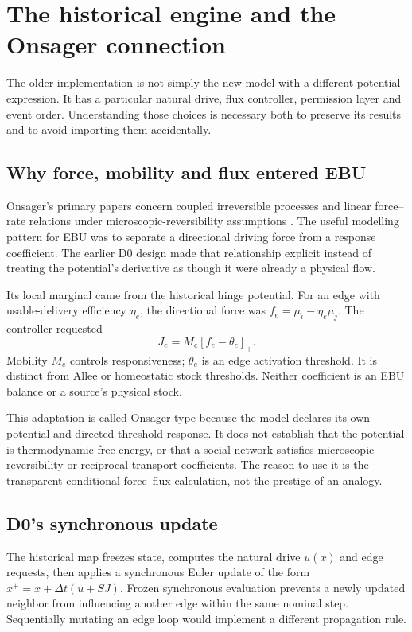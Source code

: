 \chapter{The historical engine and the Onsager connection}\label{ch:legacy-engine}
The older implementation is not simply the new model with a different
potential expression. It has a particular natural drive, flux controller,
permission layer and event order. Understanding those choices is necessary
both to preserve its results and to avoid importing them accidentally.

\section{Why force, mobility and flux entered EBU}
Onsager's primary papers concern coupled irreversible processes and linear
force--rate relations under microscopic-reversibility assumptions
\cite{onsager-one,onsager-two}. The useful modelling pattern for EBU was
to separate a directional driving force from a response coefficient. The
earlier D0 design made that relationship explicit instead of treating the
potential's derivative as though it were already a physical flow.

Its local marginal came from the historical hinge potential. For an edge
with usable-delivery efficiency $\eta_e$, the directional force was
$f_e=\mu_i-\eta_e\mu_j$. The controller requested
\begin{equation}
 J_e=M_e[f_e-\theta_e]_+.
\end{equation}
Mobility $M_e$ controls responsiveness; $\theta_e$ is an edge activation
threshold. It is distinct from Allee or homeostatic stock thresholds.
Neither coefficient is an EBU balance or a source's physical stock.

This adaptation is called Onsager-type because the model declares its own
potential and directed threshold response. It does not establish that the
potential is thermodynamic free energy, or that a social network satisfies
microscopic reversibility or reciprocal transport coefficients. The reason
to use it is the transparent conditional force--flux calculation, not the
prestige of an analogy.

\section{D0's synchronous update}
The historical map freezes state, computes the natural drive $u(x)$ and
edge requests, then applies a synchronous Euler update of the form
$x^+=x+\Delta t(u+SJ)$. Frozen synchronous evaluation prevents a newly
updated neighbor from influencing another edge within the same nominal
step. Sequentially mutating an edge loop would implement a different
propagation rule.

